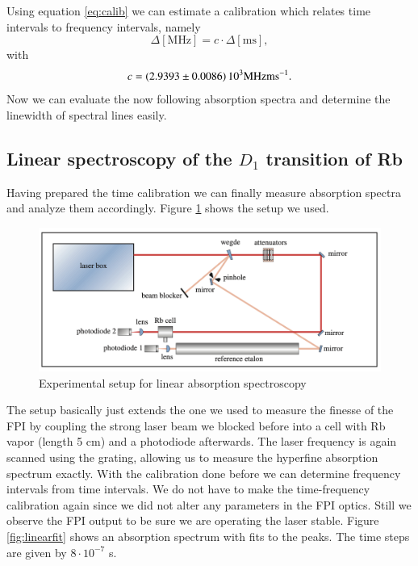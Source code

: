 \documentclass[11pt,a4paper,notitlepage]{scrartcl}
\begin{document}
Using equation \eqref{eq:calib} we can estimate a calibration which relates time intervals to frequency intervals, namely $$\Delta[\si{\mega\Hz}]=c\cdot\Delta[\si{\milli\s}],$$ with $$c=\SI{2.9393\pm0.0086}{10^3\mega\Hz \milli\s^{-1}}.$$
Now we can evaluate the now following absorption spectra and determine the linewidth of spectral lines easily.






\subsection{Linear spectroscopy of the $D_1$ transition of Rb}
Having prepared the time calibration we can finally measure absorption spectra and analyze them accordingly. Figure \ref{fig:linearspec} shows the setup we used.
\begin{figure}[htbp]
	\centering
	\includegraphics[width=\linewidth]{figs/experimental_setup/setup3.png}
	\caption{Experimental setup for linear absorption spectroscopy\cite{manual}}
	\label{fig:linearspec}
\end{figure}
The setup basically just extends the one we used to measure the finesse of the FPI by coupling the strong laser beam we blocked before into a cell with Rb vapor (length 5 cm) and a photodiode afterwards. The laser frequency is again scanned using the grating, allowing us to measure the hyperfine absorption spectrum exactly. With the calibration done before we can determine frequency intervals from time intervals. We do not have to make the time-frequency calibration again since we did not alter any parameters in the FPI optics. Still we observe the FPI output to be sure we are operating the laser stable.  Figure \ref{fig:linearfit} shows an absorption spectrum with fits to the peaks. The time steps are given by $8\cdot10^{-7}$ s.
\end{document}
